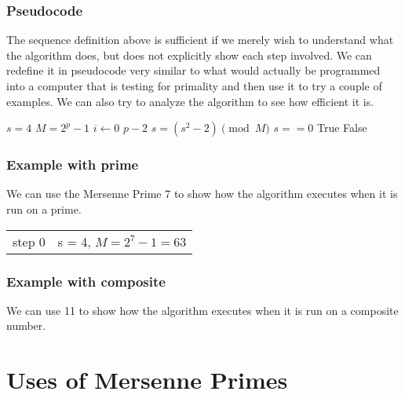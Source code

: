 \subsubsection{Pseudocode}

The sequence definition above is sufficient if we merely wish to understand what the algorithm does, but does not explicitly show each step involved.  We can redefine it in pseudocode very similar to what would actually be programmed into a computer that is testing for primality and then use it to try a couple of examples. We can also try to analyze the algorithm to see how efficient it is.

\begin{codebox}
\li$s = 4$
\li$M = 2^p - 1$
\li \For $i \gets 0$ \To $p - 2$
\Do\li
$s = (s^2 - 2) \pmod{M}$
\End\li
\If $s == 0$
\Then
\li\Return True \li
\Else
\li\Return False \li
\End
\end{codebox}

\subsubsection{Example with prime}

We can use the Mersenne Prime 7 to show how the algorithm executes when it is run on a prime.
\begin{tabular}{ll}
step 0&s = 4, $M = 2^7 -1 = 63$
\end{tabular}

\subsubsection{Example with composite} 

We can use 11 to show how the algorithm executes when it is run on a composite number.


\section{Uses of Mersenne Primes}

